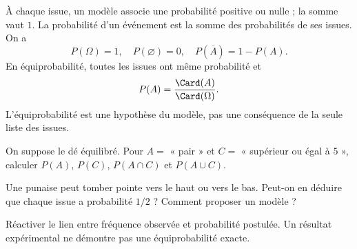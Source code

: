 \begin{keypoint}
À chaque issue, un modèle associe une probabilité positive ou nulle ; la somme vaut $1$. La probabilité d'un événement est la somme des probabilités de ses issues. On a
\[P(\Omega)=1,\quad P(\varnothing)=0,\quad P(\overline A)=1-P(A).\]
En équiprobabilité, toutes les issues ont même probabilité et
\[P(A)=\frac{\Card(A)}{\Card(\Omega)}.\]
L'équiprobabilité est une hypothèse du modèle, pas une conséquence de la seule liste des issues.
\end{keypoint}
\begin{example}On suppose le dé équilibré. Pour $A=$ « pair » et $C=$ « supérieur ou égal à $5$ », calculer $P(A)$, $P(C)$, $P(A\cap C)$ et $P(A\cup C)$.\end{example}
\begin{example}Une punaise peut tomber pointe vers le haut ou vers le bas. Peut-on en déduire que chaque issue a probabilité $1/2$ ? Comment proposer un modèle ?\end{example}
\begin{teachernote}Réactiver le lien entre fréquence observée et probabilité postulée. Un résultat expérimental ne démontre pas une équiprobabilité exacte.\end{teachernote}

